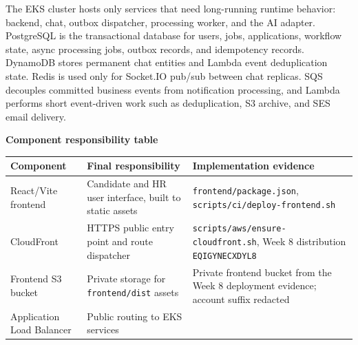 The EKS cluster hosts only services that need long-running runtime
behavior: backend, chat, outbox dispatcher, processing worker, and the
AI adapter. PostgreSQL is the transactional database for users, jobs,
applications, workflow state, async processing jobs, outbox records, and
idempotency records. DynamoDB stores permanent chat entities and Lambda
event deduplication state. Redis is used only for Socket.IO pub/sub
between chat replicas. SQS decouples committed business events from
notification processing, and Lambda performs short event-driven work
such as deduplication, S3 archive, and SES email delivery.

\vspace{0.5em}\noindent\textbf{Component responsibility
table}\par

{
\begingroup
\small
\setlength{\tabcolsep}{3pt}
\renewcommand{\arraystretch}{1.15}
\begin{longtable}{@{}
  >{\raggedright\arraybackslash}p{}
  >{\raggedright\arraybackslash}p{}
  >{\raggedright\arraybackslash}p{}@{}}
\toprule\noalign{}
\begin{minipage}[b]{\linewidth}\raggedright
Component
\end{minipage} & \begin{minipage}[b]{\linewidth}\raggedright
Final responsibility
\end{minipage} & \begin{minipage}[b]{\linewidth}\raggedright
Implementation evidence
\end{minipage} \\
\midrule\noalign{}
\endhead
\bottomrule\noalign{}
\endlastfoot
React/Vite frontend & Candidate and HR user interface, built to static
assets & \texttt{frontend/\allowbreak{}package.\allowbreak{}json},
\texttt{scripts/\allowbreak{}ci/\allowbreak{}deploy-\allowbreak{}frontend.\allowbreak{}sh} \\
CloudFront & HTTPS public entry point and route dispatcher &
\texttt{scripts/\allowbreak{}aws/\allowbreak{}ensure-\allowbreak{}cloudfront.\allowbreak{}sh}, Week 8 distribution
\texttt{EQIGYNECXDYL8} \\
Frontend S3 bucket & Private storage for \texttt{frontend/\allowbreak{}dist} assets &
Private frontend bucket from the Week 8 deployment evidence; account
suffix redacted \\
Application Load Balancer & Public routing to EKS services &

\end{longtable}}
